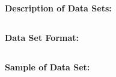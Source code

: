 \documentclass[11pt, oneside]{article}
\begin{document}
\paragraph
{\bfseries Description of Data Sets:}

\subsection{}
\paragraph
{\bfseries Data Set Format:}

\subsection{}
\paragraph
{\bfseries Sample of Data Set:}
\end{document}

